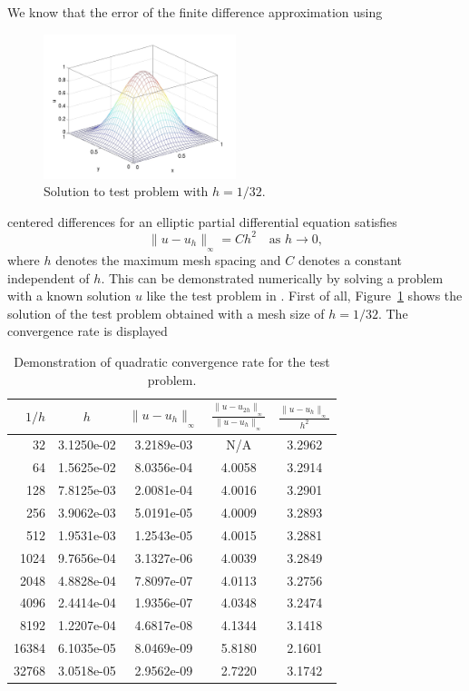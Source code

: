 \documentclass[12pt]{article}
\numberwithin{equation}{section}
\numberwithin{table}{section}
\numberwithin{figure}{section}
\newcommand{\norm}[2]{\|{#1}\|_{{}_{#2}}}
\begin{document}
We know that the error of the finite difference approximation using
\begin{figure} \centering
  \includegraphics[width=0.5\textwidth]{mesh_solution}
  \caption{Solution to test problem with $h = 1 / 32$.}
  \label{fig:solplot}
\end{figure}
centered differences for an elliptic partial differential equation
satisfies
\begin{equation} \label{equ:convratequad}
  \norm{u - u_h}{\infty} = C h^2 \quad \mbox{as $h \rightarrow 0$},
\end{equation}
where $h$ denotes the maximum mesh spacing and
$C$ denotes a constant independent of $h$.
This can be demonstrated numerically by solving a problem with
a known solution $u$ like the test problem in \cite{RaimGobbert2010Poisson}.
First of all,
Figure~\ref{fig:solplot} shows the solution of the test problem obtained with
a mesh size of $h = 1 / 32$.
The convergence rate is displayed
\begin{table} \centering
  \caption{Demonstration of quadratic convergence rate for the test problem.}
  \label{tab:convdemo}
  \vspace{0.5\baselineskip}
  \begin{tabular}{rcccc}
    \hline
    $1 / h$ & $h$ & $\norm{u - u_h}{\infty}$ &
      $\frac{\norm{u - u_{2h}}{\infty}}{\norm{u - u_h}{\infty}}$ &
      $\frac{\norm{u - u_h}{\infty}}{h^2}$ \\
    \hline
       32 &   3.1250e-02 & 3.2189e-03 &   N/A  & 3.2962 \\
       64 &   1.5625e-02 & 8.0356e-04 & 4.0058 & 3.2914 \\
      128 &   7.8125e-03 & 2.0081e-04 & 4.0016 & 3.2901 \\
      256 &   3.9062e-03 & 5.0191e-05 & 4.0009 & 3.2893 \\
      512 &   1.9531e-03 & 1.2543e-05 & 4.0015 & 3.2881 \\
     1024 &   9.7656e-04 & 3.1327e-06 & 4.0039 & 3.2849 \\
     2048 &   4.8828e-04 & 7.8097e-07 & 4.0113 & 3.2756 \\
     4096 &   2.4414e-04 & 1.9356e-07 & 4.0348 & 3.2474 \\
     8192 &   1.2207e-04 & 4.6817e-08 & 4.1344 & 3.1418 \\
    16384 &   6.1035e-05 & 8.0469e-09 & 5.8180 & 2.1601 \\
    32768 &   3.0518e-05 & 2.9562e-09 & 2.7220 & 3.1742 \\
    \hline
  \end{tabular}
\end{table}
\end{document}
